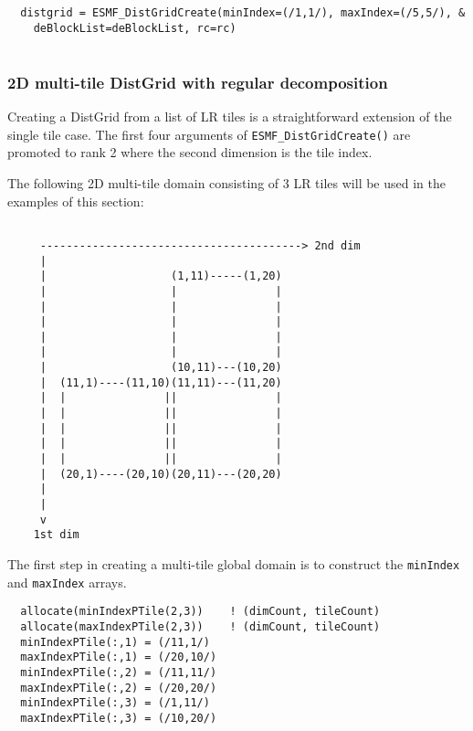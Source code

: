 
 \begin{verbatim}
  distgrid = ESMF_DistGridCreate(minIndex=(/1,1/), maxIndex=(/5,5/), &
    deBlockList=deBlockList, rc=rc)
 
\end{verbatim}
 

   \subsubsection{2D multi-tile DistGrid with regular decomposition}
   
   Creating a DistGrid from a list of LR tiles is a straightforward
   extension of the single tile case. The first four 
   arguments of {\tt ESMF\_DistGridCreate()} are promoted to rank 2 where the 
   second dimension is the tile index.
   
   The following 2D multi-tile domain consisting of 3 LR tiles will 
   be used in the examples of this section:
   \begin{verbatim}
  
     ----------------------------------------> 2nd dim
     |
     |                   (1,11)-----(1,20)
     |                   |               | 
     |                   |               | 
     |                   |               | 
     |                   |               | 
     |                   |               | 
     |                   (10,11)---(10,20)
     |  (11,1)----(11,10)(11,11)---(11,20)
     |  |               ||               |
     |  |               ||               |
     |  |               ||               |
     |  |               ||               |
     |  |               ||               |
     |  (20,1)----(20,10)(20,11)---(20,20)
     |
     |
     v
    1st dim
   \end{verbatim}
  
   The first step in creating a multi-tile global domain is to construct the
   {\tt minIndex} and {\tt maxIndex} arrays. 

 \begin{verbatim}
  allocate(minIndexPTile(2,3))    ! (dimCount, tileCount)
  allocate(maxIndexPTile(2,3))    ! (dimCount, tileCount)
  minIndexPTile(:,1) = (/11,1/)
  maxIndexPTile(:,1) = (/20,10/)
  minIndexPTile(:,2) = (/11,11/)
  maxIndexPTile(:,2) = (/20,20/)
  minIndexPTile(:,3) = (/1,11/)
  maxIndexPTile(:,3) = (/10,20/)
 
\end{verbatim}
 
